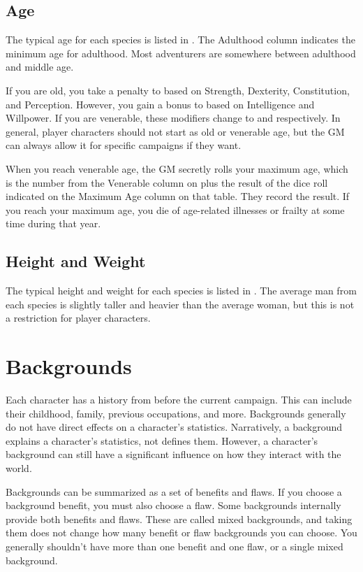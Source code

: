   \subsection{Age}
    The typical age for each species is listed in .
    The Adulthood column indicates the minimum age for adulthood.
    Most adventurers are somewhere between adulthood and middle age.

    If you are old, you take a  penalty to  based on Strength, Dexterity, Constitution, and Perception.
    However, you gain a  bonus to  based on Intelligence and Willpower.
    If you are venerable, these modifiers change to  and  respectively.
    In general, player characters should not start as old or venerable age, but the GM can always allow it for specific campaigns if they want.

    When you reach venerable age, the GM secretly rolls your maximum age, which is the number from the Venerable column on  plus the result of the dice roll indicated on the Maximum Age column on that table.
    They record the result.
    If you reach your maximum age, you die of age-related illnesses or frailty at some time during that year.

  \subsection{Height and Weight}
    The typical height and weight for each species is listed in .
    The average man from each species is slightly taller and heavier than the average woman, but this is not a restriction for player characters.

\section{Backgrounds}\label{Backgrounds}
  Each character has a history from before the current campaign.
  This can include their childhood, family, previous occupations, and more.
  Backgrounds generally do not have direct effects on a character's statistics.
  Narratively, a background explains a character's statistics, not defines them.
  However, a character's background can still have a significant influence on how they interact with the world.

  Backgrounds can be summarized as a set of benefits and flaws.
  If you choose a background benefit, you must also choose a flaw.
  Some backgrounds internally provide both benefits and flaws.
  These are called mixed backgrounds, and taking them does not change how many benefit or flaw backgrounds you can choose.
  You generally shouldn't have more than one benefit and one flaw, or a single mixed background.

